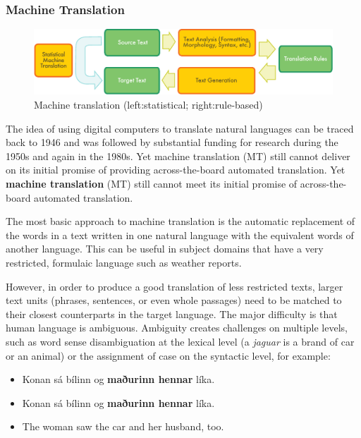 \begin{multicols}{2}
\subsubsection{Machine Translation}

\begin{figure}[htb]
  \center
  \includegraphics[width=\textwidth]{../_media/english/machine_translation}
  \caption{Machine translation (left:statistical; right:rule-based)}
  \label{fig:mtarch_en}
\end{figure}

The idea of using digital computers to translate natural languages can be traced back to 1946 and was followed by substantial funding for research during the 1950s and again in the 1980s. 
Yet machine translation (MT) still cannot deliver on its initial promise of providing across-the-board automated translation.  
Yet \textbf{machine translation} (MT) still cannot meet its initial promise of across-the-board automated translation. 

The most basic approach to machine translation is the automatic replacement of the words in a text written in one natural language with the equivalent words of another language. This can be useful in subject domains that have a very restricted, formulaic language such as weather reports.

However, in order to produce a good translation of less restricted texts, larger text units (phrases, sentences, or even whole passages) need to be matched to their closest counterparts in the target language. The major difficulty is that human language is ambiguous. Ambiguity creates challenges on multiple levels, such as word sense disambiguation at the lexical level (a \textit{jaguar} is a brand of car or an animal) or the assignment of case on the syntactic level, for example:

\begin{itemize}
\item Konan sá bílinn og \textbf{maðurinn hennar} líka.
\item Konan sá bílinn og \textbf{maðurinn hennar} líka.
\item The woman saw the car and her husband, too.
\end{itemize}


\end{multicols}
